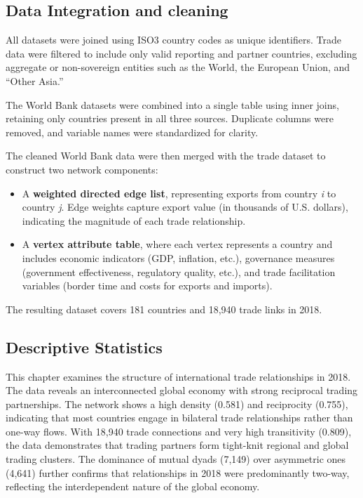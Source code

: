 \documentclass[
]{article}
\begin{document}
\subsection{Data Integration and
cleaning}\label{data-integration-and-cleaning}

All datasets were joined using ISO3 country codes as unique identifiers.
Trade data were filtered to include only valid reporting and partner
countries, excluding aggregate or non-sovereign entities such as the
World, the European Union, and ``Other Asia.''

The World Bank datasets were combined into a single table using inner
joins, retaining only countries present in all three sources. Duplicate
columns were removed, and variable names were standardized for clarity.

The cleaned World Bank data were then merged with the trade dataset to
construct two network components:

\begin{itemize}
\item
  A \textbf{weighted directed edge list}, representing exports from
  country \emph{i} to country \emph{j}. Edge weights capture export
  value (in thousands of U.S. dollars), indicating the magnitude of each
  trade relationship.
\item
  A \textbf{vertex attribute table}, where each vertex represents a
  country and includes economic indicators (GDP, inflation, etc.),
  governance measures (government effectiveness, regulatory quality,
  etc.), and trade facilitation variables (border time and costs for
  exports and imports).
\end{itemize}

The resulting dataset covers 181 countries and 18,940 trade links in
2018.

\subsection{Descriptive Statistics}\label{descriptive-statistics}

This chapter examines the structure of international trade relationships
in 2018. The data reveals an interconnected global economy with strong
reciprocal trading partnerships. The network shows a high density
(0.581) and reciprocity (0.755), indicating that most countries engage
in bilateral trade relationships rather than one-way flows. With 18,940
trade connections and very high transitivity (0.809), the data
demonstrates that trading partners form tight-knit regional and global
trading clusters. The dominance of mutual dyads (7,149) over asymmetric
ones (4,641) further confirms that relationships in 2018 were
predominantly two-way, reflecting the interdependent nature of the
global economy.
\end{document}

